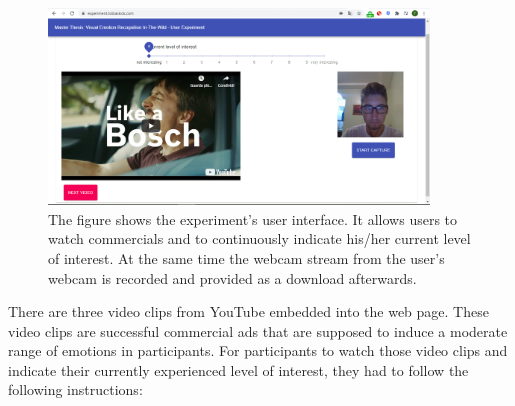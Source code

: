 \begin{center}
\begin{figure}[H]
  \begin{center}
  \includegraphics[angle=0, width=0.9\textwidth]{Figures/UserExperiment.PNG}
  \caption[Implemented UI for the user experiment]{The figure shows the experiment's user interface. It allows users to watch commercials and to continuously indicate his/her current level of interest. At the same time the webcam stream from the user's webcam is recorded and provided as a download afterwards.}
  \label{fig:InterfaceUserExperiment}
  \end{center}
\end{figure}
\end{center}

There are three video clips from YouTube embedded into the web page. These video clips are successful commercial ads that are supposed to induce a moderate range of emotions in participants.
\newline\newline
For participants to watch those video clips and indicate their currently experienced level of interest, they had to follow the following instructions:

